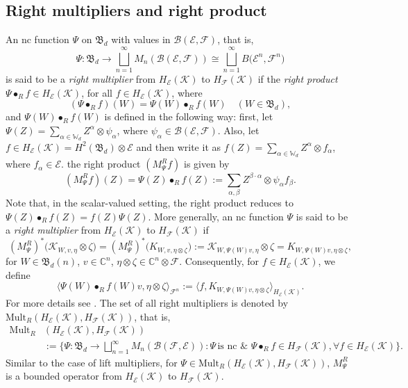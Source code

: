 \documentclass[12pt]{amsart}%
\numberwithin{equation}{section}
\newcommand{\fB}{{\mathfrak{B}}}
\newcommand{\clb}{\mathcal{B}}
\newcommand{\cle}{\mathcal{E}}
\newcommand{\clf}{\mathcal{F}}
\newcommand{\clk}{\mathcal{K}}
\newcommand{\C}{\mathbb{C}}
\begin{document}
\subsection{Right multipliers and right product}
An nc function 
$\Psi$ on $\fB_d$ with values in $\clb(\cle, \clf)$, that is,
\[
\Psi:\fB_d \to \bigsqcup_{n=1}^\infty M_n(\clb(\cle, \clf))\cong\bigsqcup_{n=1}^{\infty} B\big(\cle^n, \clf^n\big)
\]
is said to be a \textit{right multiplier} from $H_\cle(\clk)$ to $H_\clf(\clk)$ if the \textit{right product} $\Psi \bullet_R f\in H_\cle(\clk)$, for all $f\in H_\cle(\clk)$, where
\[
(\Psi \bullet_R f)(W)=\Psi(W) \bullet_R f(W)\quad(W\in \fB_d),
\] 
and $\Psi(W) \bullet_R f(W)$ is defined in the following way: first, let  $\Psi(Z)=\sum_{\alpha\in \mathbb{W}_d} Z^\alpha \otimes \psi_\alpha$, where $\psi_\alpha\in \clb(\cle, \clf)$. Also, let $f\in H_\cle(\clk)=H^2(\fB_d)\otimes \cle$ and then write it as $f(Z)=\sum_{\alpha\in \mathbb{W}_d} Z^\alpha\otimes f_\alpha$, where $f_\alpha\in \cle$. the right product $(M^R_\Psi f)$ is given by
\[(M^R_\Psi f)(Z)=\Psi(Z) \bullet_R f(Z):= \sum_{\alpha, \beta} Z^{\beta \cdot \alpha}\otimes \psi_\alpha f_\beta.\]
Note that, in the scalar-valued setting, the right product reduces to $\Psi (Z) \bullet_R f(Z)= f(Z) \Psi(Z)$. More generally, an nc function $\Psi$ is said to be a \textit{right multiplier} from $H_\cle(\clk)$ to $H_\clf(\clk)$ if 
\begin{equation}\label{right_adjoint_action}
(M^R_\Psi)^* \big (\clk_{W, v, \eta}\otimes \zeta\big )=(M^R_\Psi)^* \big (K_{W, v, \eta\otimes \zeta}\big ):= \clk_{W, \Psi(W)v, \eta}\otimes \zeta=K_{W, \Psi(W)v, \eta\otimes \zeta}, 
\end{equation}
for $W\in\fB_d(n)$, $v\in \C^n$, $\eta \otimes \zeta \in \C^n\otimes \clf$. Consequently, for $f\in H_\cle(\clk)$, we define 
\[
\langle \Psi(W) \bullet_R f(W) v, \eta \otimes \zeta\rangle_{\clf^n}:=\langle f, K_{W, \Psi(W)v, \eta\otimes \zeta}\rangle_{H_\cle(\clk)}.
\]
For more details see \cite{JM}. The set of all right multipliers is denoted by $\text{Mult}_R(H_\cle(\clk), H_\clf(\clk))$, that is, 
\begin{align*}
\text{Mult}_R&(H_\cle(\clk), H_\clf(\clk))\\
&:=\Big \{\Psi: \fB_d \to \bigsqcup_{n=1}^\infty M_n(\clb(\clf, \cle)):\Psi \,\text{is nc}\,\, \& \,\,\Psi \bullet_R f\in H_\clf(\clk),  \forall f\in H_\cle(\clk) \Big \}.
\end{align*}
Similar to the case of lift multipliers, for $\Psi\in \text{Mult}_R(H_\cle(\clk), H_\clf(\clk))$, $M^R_\Psi $ is a bounded operator from $H_\cle(\clk)$ to $H_\clf(\clk)$.
\end{document}
